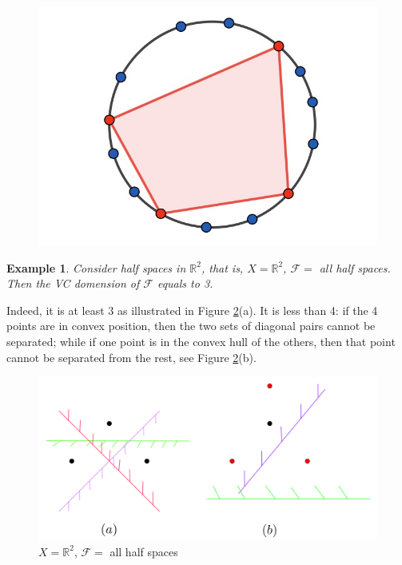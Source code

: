 \documentclass{article}
\newtheorem{example}[theorem]{Example}
\theoremstyle{definition}
\begin{document}
\begin{figure}[H]
        \centering
        \includegraphics[scale=0.2]{20-1.jpg}
        \label{fig:20-1}
\end{figure}

\begin{example}
Consider half spaces in $\mathbb{R}^2$, that is, $X=\mathbb{R}^2$, $\mathcal{F}=$ all half spaces. Then the VC domension of $\mathcal{F}$ equals to 3.  
\end{example}
Indeed, it is at least 3 as illustrated in Figure \ref{fig:20-2}(a). It is less than 4: if the 4 points are in convex position, then the two sets of diagonal pairs cannot be separated; while if one point is in the convex hull of the others, then that point cannot be separated from the rest, see Figure \ref{fig:20-2}(b).
\begin{figure}[H]
        \centering
        \includegraphics[scale=0.3]{20-2.jpg}
        \caption{$X=\mathbb{R}^2$, $\mathcal{F}=$ all half spaces}
        \label{fig:20-2}
\end{figure}
\end{document}
